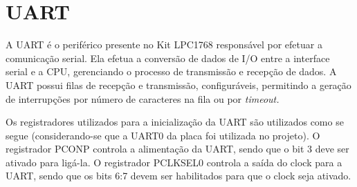 
\section{UART}

A UART é o periférico presente no Kit LPC1768 responsável por efetuar a comunicação serial. Ela efetua a conversão de dados de I/O entre a interface serial e a CPU, gerenciando o processo de transmissão e recepção de dados. A UART possui filas de recepção e transmissão, configuráveis, permitindo a geração de interrupções por número de caracteres na fila ou por \it{timeout}. 

Os registradores utilizados para a inicialização da UART são utilizados como se segue (considerando-se que a UART0 da placa foi utilizada no projeto). O registrador PCONP controla a alimentação da UART, sendo que o bit 3 deve ser ativado para ligá-la. O registrador PCLKSEL0 controla a saída do clock para a UART, sendo que os bits 6:7 devem ser habilitados para que o clock seja ativado.










